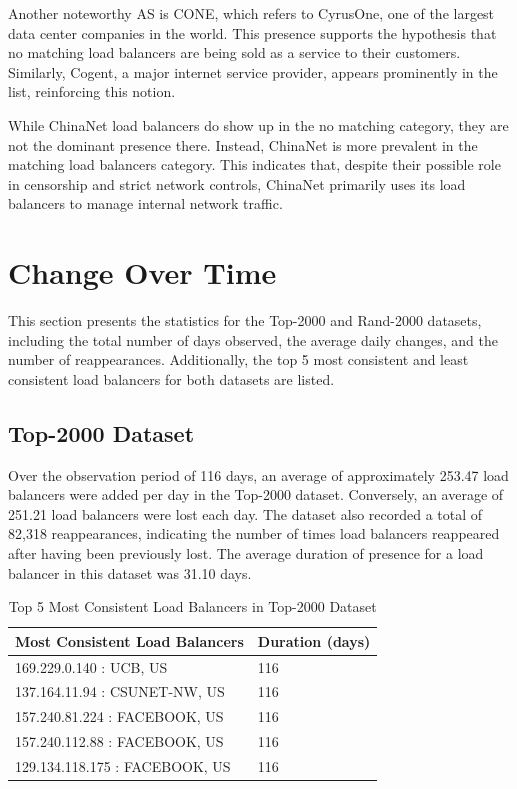 \documentclass[12pt]{cwru_thesis}
\begin{document}
Another noteworthy AS is CONE, which refers to CyrusOne, one of the largest data center companies in the world. This presence supports the hypothesis that no matching load balancers are being sold as a service to their customers. Similarly, Cogent, a major internet service provider, appears prominently in the list, reinforcing this notion.

While ChinaNet load balancers do show up in the no matching category, they are not the dominant presence there. Instead, ChinaNet is more prevalent in the matching load balancers category. This indicates that, despite their possible role in censorship and strict network controls, ChinaNet primarily uses its load balancers to manage internal network traffic.
\newpage
\section{Change Over Time}

This section presents the statistics for the Top-2000 and Rand-2000 datasets, including the total number of days observed, the average daily changes, and the number of reappearances. Additionally, the top 5 most consistent and least consistent load balancers for both datasets are listed.

\subsection{Top-2000 Dataset}

Over the observation period of 116 days, an average of approximately 253.47 load balancers were added per day in the Top-2000 dataset. Conversely, an average of 251.21 load balancers were lost each day. The dataset also recorded a total of 82,318 reappearances, indicating the number of times load balancers reappeared after having been previously lost. The average duration of presence for a load balancer in this dataset was 31.10 days.

\begin{table}[h!]
    \centering
    \begin{tabular}{|l|l|}
        \hline
        \textbf{Most Consistent Load Balancers} & \textbf{Duration (days)} \\ \hline
        169.229.0.140 : UCB, US & 116 \\ \hline
        137.164.11.94 : CSUNET-NW, US & 116 \\ \hline
        157.240.81.224 : FACEBOOK, US & 116 \\ \hline
        157.240.112.88 : FACEBOOK, US & 116 \\ \hline
        129.134.118.175 : FACEBOOK, US & 116 \\ \hline
    \end{tabular}
    \caption{Top 5 Most Consistent Load Balancers in Top-2000 Dataset}
\end{table}
\end{document}
